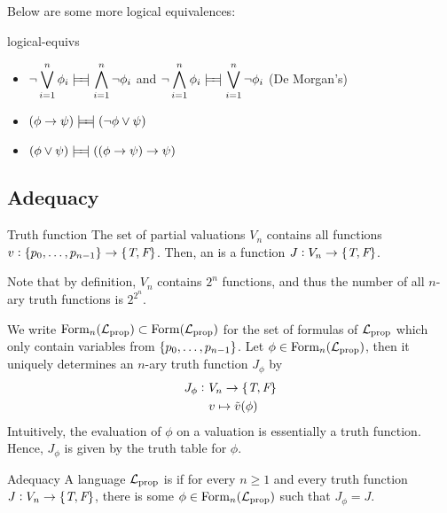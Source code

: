 \documentclass{styles/tufte}
\begin{document}
Below are some more logical equivalences:
\begin{proposition}{}{logical-equivs}
  \vspace{-1em}
  \begin{itemize}
    \item $\displaystyle \neg\disj_{i=1}^n \phi_i \lequiv \conj_{i=1}^n \neg\phi_i$ \quad and \quad $\displaystyle \neg\conj_{i=1}^n \phi_i \lequiv \disj_{i=1}^n \neg\phi_i$ \hfill (De Morgan's)
    \item $(\phi \implies \psi) \lequiv (\neg\phi \lor \psi)$
    \item $(\phi \lor \psi) \lequiv ((\phi \implies \psi) \implies \psi)$
  \end{itemize}
\end{proposition}


\subsection{Adequacy}

  \begin{definition}{Truth function}{}
    The set of partial valuations $V_n$ contains all functions $v: \set{p_0, \dots, p_{n-1}} \to \set{\textit{T}, \textit{F}}$. Then, an  is a function $J: V_n \to \set{\textit{T}, \textit{F}}$.
  \end{definition}
  
  Note that by definition, $V_n$ contains $2^n$ functions, and thus the number of all $n$-ary truth functions is $2^{2^n}$.
  
  We write $\operatorname{Form}_n(\mathcal{L}_\textrm{prop}) \subset \operatorname{Form}(\mathcal{L}_\textrm{prop})$ for the set of formulas of $\mathcal{L}_\textrm{prop}$ which only contain variables from $\set{p_0, \dots, p_{n-1}}$. Let $\phi \in \operatorname{Form}_n(\mathcal{L}_\textrm{prop})$, then it uniquely determines an $n$-ary truth function $J_\phi$ by
  \begin{align*}
    J_\phi:\ &V_n \to \set{\textit{T}, \textit{F}} \\
    &v \mapsto \tilde{v}(\phi)
  \end{align*}
  Intuitively, the evaluation of $\phi$ on a valuation is essentially a truth function. Hence, $J_\phi$ is given by the truth table for $\phi$.
  
  \begin{definition}{Adequacy}{}
    A language $\mathcal{L}_\textrm{prop}$ is  if for every $n \geq 1$ and every truth function $J: V_n \to \set{\textit{T}, \textit{F}}$, there is some $\phi \in \operatorname{Form}_n(\mathcal{L}_\textrm{prop})$ such that $J_\phi = J$.
  \end{definition}
  
\end{document}
